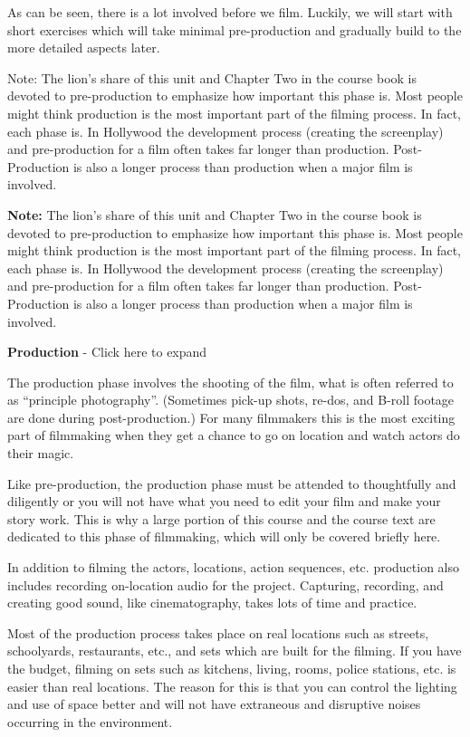 \documentclass[
]{book}
\begin{document}
As can be seen, there is a lot involved before we film. Luckily, we will start with short exercises which will take minimal pre-production and gradually build to the more detailed aspects later.

Note: The lion's share of this unit and Chapter Two in the course book is devoted to pre-production to emphasize how important this phase is. Most people might think production is the most important part of the filming process. In fact, each phase is. In Hollywood the development process (creating the screenplay) and pre-production for a film often takes far longer than production. Post-Production is also a longer process than production when a major film is involved.

\textbf{Note:} The lion's share of this unit and Chapter Two in the course book is devoted to pre-production to emphasize how important this phase is. Most people might think production is the most important part of the filming process. In fact, each phase is. In Hollywood the development process (creating the screenplay) and pre-production for a film often takes far longer than production. Post-Production is also a longer process than production when a major film is involved.

\textbf{Production} - Click here to expand

The production phase involves the shooting of the film, what is often referred to as ``principle photography''. (Sometimes pick-up shots, re-dos, and B-roll footage are done during post-production.) For many filmmakers this is the most exciting part of filmmaking when they get a chance to go on location and watch actors do their magic.

Like pre-production, the production phase must be attended to thoughtfully and diligently or you will not have what you need to edit your film and make your story work. This is why a large portion of this course and the course text are dedicated to this phase of filmmaking, which will only be covered briefly here.

In addition to filming the actors, locations, action sequences, etc. production also includes recording on-location audio for the project. Capturing, recording, and creating good sound, like cinematography, takes lots of time and practice.

Most of the production process takes place on real locations such as streets, schoolyards, restaurants, etc., and sets which are built for the filming. If you have the budget, filming on sets such as kitchens, living, rooms, police stations, etc. is easier than real locations. The reason for this is that you can control the lighting and use of space better and will not have extraneous and disruptive noises occurring in the environment.
\end{document}
